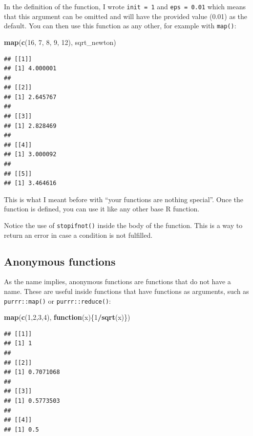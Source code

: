 \documentclass[]{gitbook}
\newenvironment{Shaded}{\begin{snugshade}}{\end{snugshade}}
\newcommand{\ControlFlowTok}[1]{\textcolor[rgb]{0.13,0.29,0.53}{\textbf{#1}}}
\newcommand{\DecValTok}[1]{\textcolor[rgb]{0.00,0.00,0.81}{#1}}
\newcommand{\KeywordTok}[1]{\textcolor[rgb]{0.13,0.29,0.53}{\textbf{#1}}}
\newcommand{\NormalTok}[1]{#1}
\newcommand{\OperatorTok}[1]{\textcolor[rgb]{0.81,0.36,0.00}{\textbf{#1}}}
\begin{document}
In the definition of the function, I wrote \texttt{init\ =\ 1} and \texttt{eps\ =\ 0.01} which means that this
argument can be omitted and will have the provided value (0.01) as the default. You can then use
this function as any other, for example with \texttt{map()}:

\begin{Shaded}
\begin{Highlighting}[]
\KeywordTok{map}\NormalTok{(}\KeywordTok{c}\NormalTok{(}\DecValTok{16}\NormalTok{, }\DecValTok{7}\NormalTok{, }\DecValTok{8}\NormalTok{, }\DecValTok{9}\NormalTok{, }\DecValTok{12}\NormalTok{), sqrt_newton)}
\end{Highlighting}
\end{Shaded}

\begin{verbatim}
## [[1]]
## [1] 4.000001
## 
## [[2]]
## [1] 2.645767
## 
## [[3]]
## [1] 2.828469
## 
## [[4]]
## [1] 3.000092
## 
## [[5]]
## [1] 3.464616
\end{verbatim}

This is what I meant before with ``your functions are nothing special''. Once the function is
defined, you can use it like any other base R function.

Notice the use of \texttt{stopifnot()} inside the body of the function. This is a way to return an error
in case a condition is not fulfilled.

\hypertarget{anonymous-functions}{%
\subsection{Anonymous functions}\label{anonymous-functions}}

As the name implies, anonymous functions are functions that do not have a name. These are useful inside
functions that have functions as arguments, such as \texttt{purrr::map()} or \texttt{purrr::reduce()}:

\begin{Shaded}
\begin{Highlighting}[]
\KeywordTok{map}\NormalTok{(}\KeywordTok{c}\NormalTok{(}\DecValTok{1}\NormalTok{,}\DecValTok{2}\NormalTok{,}\DecValTok{3}\NormalTok{,}\DecValTok{4}\NormalTok{), }\ControlFlowTok{function}\NormalTok{(x)\{}\DecValTok{1}\OperatorTok{/}\KeywordTok{sqrt}\NormalTok{(x)\})}
\end{Highlighting}
\end{Shaded}

\begin{verbatim}
## [[1]]
## [1] 1
## 
## [[2]]
## [1] 0.7071068
## 
## [[3]]
## [1] 0.5773503
## 
## [[4]]
## [1] 0.5
\end{verbatim}
\end{document}

